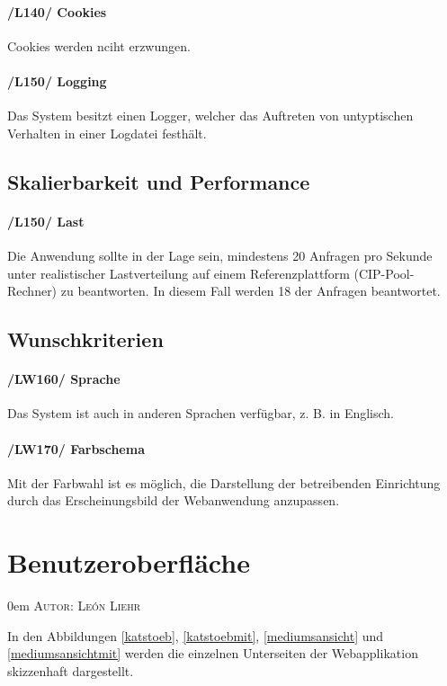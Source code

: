 \documentclass{article}
\makeatletter
\newcommand{\sectionauthor}[1]{
	{\parindent 0em \large \scshape Autor: #1 \par \nobreak \vspace*{2em}}
	\@afterheading
}
\makeatother
\begin{document}
   \paragraph{/L140/ \label{L140} Cookies}
   Cookies werden nciht erzwungen.

   \paragraph{/L150/ \label{L150} Logging}
    Das System besitzt einen Logger, welcher das Auftreten von untyptischen Verhalten in einer Logdatei festhält.

 \subsection{Skalierbarkeit und Performance}
	        \paragraph{
	        /L150/ \label{L150} Last}
	       Die Anwendung sollte in der Lage sein, mindestens 20 Anfragen pro Sekunde unter realistischer Lastverteilung auf einem Referenzplattform (CIP-Pool-Rechner) zu beantworten. In diesem Fall werden 18 der Anfragen beantwortet.


\subsection{Wunschkriterien}
	    \paragraph{/LW160/ \label{LW160} Sprache}
	    Das System ist auch in anderen Sprachen verfügbar, z. B. in Englisch.

\paragraph{/LW170/ \label{LW170} Farbschema}
	       Mit der Farbwahl ist es möglich, die Darstellung der betreibenden Einrichtung durch das Erscheinungsbild der Webanwendung anzupassen.

	   \section{Benutzeroberfläche} %
\sectionauthor{León Liehr}

In den Abbildungen \ref{katstoeb}, \ref{katstoebmit}, \ref{mediumsansicht} und \ref{mediumsansichtmit} werden die einzelnen Unterseiten der Webapplikation skizzenhaft dargestellt.
\end{document}
